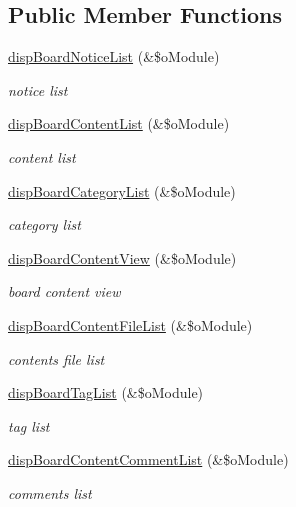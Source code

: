 \subsection*{Public Member Functions}
\begin{DoxyCompactItemize}
\item 
\hyperlink{classboardAPI_a18395a2be76383d74317c1fcc1fb5830}{disp\-Board\-Notice\-List} (\&\$o\-Module)
\begin{DoxyCompactList}\small\item\em notice list \end{DoxyCompactList}\item 
\hyperlink{classboardAPI_a7002a8159c34d85b969647c04f3baaa3}{disp\-Board\-Content\-List} (\&\$o\-Module)
\begin{DoxyCompactList}\small\item\em content list \end{DoxyCompactList}\item 
\hyperlink{classboardAPI_aa527b1afc48bacd728b5d95e969a60f6}{disp\-Board\-Category\-List} (\&\$o\-Module)
\begin{DoxyCompactList}\small\item\em category list \end{DoxyCompactList}\item 
\hyperlink{classboardAPI_aeaa451d5556251f9d148350b34d0481a}{disp\-Board\-Content\-View} (\&\$o\-Module)
\begin{DoxyCompactList}\small\item\em board content view \end{DoxyCompactList}\item 
\hyperlink{classboardAPI_a38441526c56c77613bb6681cf5c927d5}{disp\-Board\-Content\-File\-List} (\&\$o\-Module)
\begin{DoxyCompactList}\small\item\em contents file list \end{DoxyCompactList}\item 
\hyperlink{classboardAPI_af31d812495ea03d7a81c836463a56cad}{disp\-Board\-Tag\-List} (\&\$o\-Module)
\begin{DoxyCompactList}\small\item\em tag list \end{DoxyCompactList}\item 
\hyperlink{classboardAPI_af5b1506259e5aaec1b6f743ac6548203}{disp\-Board\-Content\-Comment\-List} (\&\$o\-Module)
\begin{DoxyCompactList}\small\item\em comments list \end{DoxyCompactList}\item 

\end{DoxyCompactItemize}
